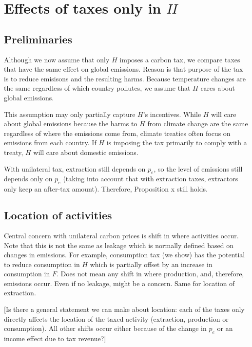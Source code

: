 \documentclass[notitlepage,12pt]{article}
\begin{document}
\section{Effects of taxes only in $H$}

\subsection{Preliminaries}

Although we now assume that only $H$ imposes a carbon tax, we compare taxes
that have the same effect on global emissions. Reason is that purpose of the
tax is to reduce emisisons and the resulting harms. Because temperature
changes are the same regardless of which country pollutes, we assume that $H$
cares about global emissions.

This assumption may only partially capture $H$'s incentives. While $H$ will
care about global emissions because the harms to $H$ from climate change are
the same regardless of where the emissions come from, climate treaties often
focus on emissions from each country. If $H$ is imposing the tax primarily
to comply with a treaty, $H$ will care about domestic emissions.

With unilateral tax, extraction still depends on $p_{e}$, so the level of
emissions still depends only on $p_{e}$ (taking into account that with
extraction taxes, extractors only keep an after-tax amount). Therefore,
Proposition x still holds.

\subsection{Location of activities}

Central concern with unilateral carbon prices is shift in where activities
occur. Note that this is not the same as leakage which is normally defined
based on changes in emissions. For example, consumption tax (we show) has
the potential to reduce consumption in $H$ which is partially offset by an
increase in consumption in $F$. Does not mean any shift in where production,
and, therefore, emissions occur. Even if no leakage, might be a concern.
Same for location of extraction.

[Is there a general statement we can make about location: each of the taxes
only directly affects the location of the taxed activity (extraction,
production or consumption). All other shifts occur either because of the
change in $p_{e}$ or an income effect due to tax revenue?]
\end{document}
